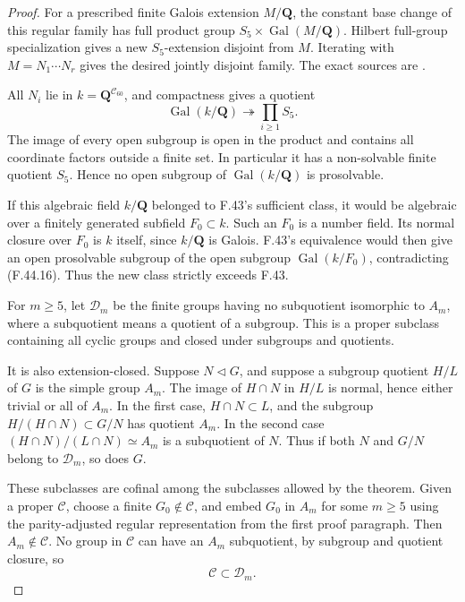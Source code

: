 \begin{proof}
For a prescribed finite Galois extension \(M/\mathbf Q\), the constant base change of this regular family has full product group \(S_5\times\operatorname{Gal}(M/\mathbf Q)\). Hilbert full-group specialization gives a new \(S_5\)-extension disjoint from \(M\). Iterating with \(M=N_1\cdots N_r\) gives the desired jointly disjoint family. The exact sources are \citet[Proposition~3.3.3 and Corollary~3.3.4, p.~24; Proposition~3.3.1, p.~23; Theorem~3.4.1, p.~25]{F_Serre2007}.

All \(N_i\) lie in \(k=\mathbf Q^{\mathcal C_{60}}\), and compactness gives a quotient
\[
             \operatorname{Gal}(k/\mathbf Q)
                         \twoheadrightarrow\prod_{i\ge1}S_5.
 \tag{F.44.16}
\]
The image of every open subgroup is open in the product and contains all coordinate factors outside a finite set. In particular it has a non-solvable finite quotient \(S_5\). Hence no open subgroup of \(\operatorname{Gal}(k/\mathbf Q)\) is prosolvable.

If this algebraic field \(k/\mathbf Q\) belonged to F.43's sufficient class, it would be algebraic over a finitely generated subfield \(F_0\subset k\). Such an \(F_0\) is a number field. Its normal closure over \(F_0\) is \(k\) itself, since \(k/\mathbf Q\) is Galois. F.43's equivalence would then give an open prosolvable subgroup of the open subgroup \(\operatorname{Gal}(k/F_0)\), contradicting \textup{(F.44.16)}. Thus the new class strictly exceeds F.43.



For \(m\ge5\), let \(\mathcal D_m\) be the finite groups having no subquotient isomorphic to \(A_m\), where a subquotient means a quotient of a subgroup. This is a proper subclass containing all cyclic groups and closed under subgroups and quotients.

It is also extension-closed. Suppose \(N\triangleleft G\), and suppose a subgroup quotient \(H/L\) of \(G\) is the simple group \(A_m\). The image of \(H\cap N\) in \(H/L\) is normal, hence either trivial or all of \(A_m\). In the first case, \(H\cap N\subset L\), and the subgroup \(H/(H\cap N)\subset G/N\) has quotient \(A_m\). In the second case \((H\cap N)/(L\cap N)\simeq A_m\) is a subquotient of \(N\). Thus if both \(N\) and \(G/N\) belong to \(\mathcal D_m\), so does \(G\).

These subclasses are cofinal among the subclasses allowed by the theorem. Given a proper \(\mathcal C\), choose a finite \(G_0\notin\mathcal C\), and embed \(G_0\) in \(A_m\) for some \(m\ge5\) using the parity-adjusted regular representation from the first proof paragraph. Then \(A_m\notin\mathcal C\). No group in \(\mathcal C\) can have an \(A_m\) subquotient, by subgroup and quotient closure, so
\[
                          \mathcal C\subset\mathcal D_m.
 \tag{F.44.17}
\]


\end{proof}
